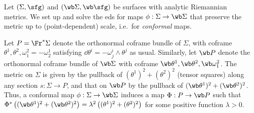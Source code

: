 \begin{example}
    Let $(\Sigma,\sfg)$ and $(\wb\Sigma,\wb \sfg)$ be surfaces with analytic Riemannian metrics. We set up and solve the \gls{eds} for maps $\phi:\Sigma\to \wb \Sigma$ that preserve the metric up to (point-dependent) scale, i.e.\ for \emph{conformal} maps.

    Let $P=\Fr^\ast\Sigma$ denote the orthonormal coframe bundle of $\Sigma$, with coframe $\theta^1,\theta^2,\omega^2_1=-\omega^1_2$ satisfying $\dd\theta^i=-\omega^i_j\wedge \theta^j$ as usual. Similarly, let $\wb P$ denote the orthonormal coframe bundle of $\wb\Sigma$ with coframe $\wb\theta^1,\wb\theta^2,\wb\omega^2_1$. The metric on $\Sigma$ is given by the pullback of $(\theta^1)^2+(\theta^2)^2$ (tensor squares) along any section $s:\Sigma\to P$, and that on $\wb P$ by the pullback of $(\wb\theta^1)^2+(\wb\theta^2)^2$. Thus, a conformal map $\phi:\Sigma\to \wb\Sigma$ induces  a map $\Phi:P\to \wb P$ such that $\Phi^\ast \left((\wb\theta^1)^2+(\wb\theta^2)^2\right)=\lambda^2 \left((\theta^1)^2+(\theta^2)^2\right)$ for some positive function $\lambda>0$.


\end{example}
